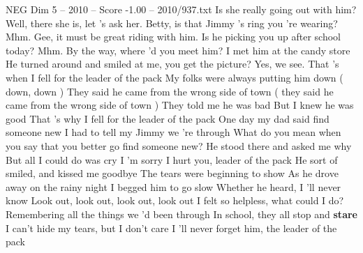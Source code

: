 \begin{textsample}{NEG Dim 5 – 2010 – Score -1.00 – 2010/937.txt}  \label{ex:f5_neg_005}
Is she really going out with him?
Well, there she is, let 's ask her.
Betty, is that Jimmy 's ring you 're wearing?
Mhm.
Gee, it must be great riding with him.
Is he picking you up after school today?
Mhm.
By the way, where 'd you meet him?
I met him at the candy store He turned around and smiled at me, you get the picture?
Yes, we see.
That 's when I fell for the leader of the pack My folks were always putting him down ( down, down ) They said he came from the wrong side of town ( they said he came from the wrong side of town ) They told me he was bad But I knew he was good That 's why I fell for the leader of the pack One day my dad said find someone new I had to tell my Jimmy we 're through What do you mean when you say that you better go find someone new?
He stood there and asked me why But all I could do was cry I 'm sorry I hurt you, leader of the pack He sort of smiled, and kissed me goodbye The tears were beginning to show As he drove away on the rainy night I begged him to go slow Whether he heard, I 'll never know Look out, look out, look out, look out I felt so helpless, what could I do?
Remembering all the things we 'd been through In school, they all stop and \textbf{stare} I can't hide my tears, but I don't care I 'll never forget him, the leader of the pack

\end{textsample}
